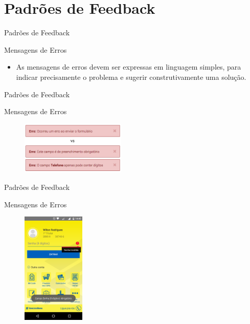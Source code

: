 \section{Padrões de Feedback}

\begin{frame}{Padrões de Feedback}
\begin{block}{Mensagens de Erros}
  \begin{itemize}
    \item<1-> As mensagens de erros devem ser expressas em linguagem simples, para indicar precisamente o problema e sugerir construtivamente uma solução. 
  \end{itemize}
\end{block}
\end{frame}

\begin{frame}{Padrões de Feedback}
\begin{block}{Mensagens de Erros}
    \begin{figure}[\center]
    \includegraphics[width=5cm]{figuras/error/msg_error}
    \end{figure}
\end{block}
\end{frame}

\begin{frame}{Padrões de Feedback}
\begin{block}{Mensagens de Erros}
    \begin{figure}
    \includegraphics[width=3cm]{figuras/error/error2}
    \end{figure}
\end{block}
\end{frame}


